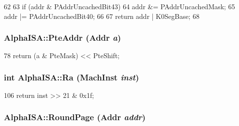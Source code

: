 \begin{DoxyCode}
62 {
63     if (addr & PAddrUncachedBit43) {
64         addr &= PAddrUncachedMask;
65         addr |= PAddrUncachedBit40;
66     }
67     return addr | K0SegBase;
68 }
\end{DoxyCode}
\hypertarget{namespaceAlphaISA_a7011d6b73edace006e7c43b09d9ae703}{
\subsubsection[{PteAddr}]{ AlphaISA::PteAddr ({\bf Addr} {\em a})}}
\label{namespaceAlphaISA_a7011d6b73edace006e7c43b09d9ae703}



\begin{DoxyCode}
78 { return (a & PteMask) << PteShift; }
\end{DoxyCode}
\hypertarget{namespaceAlphaISA_a5fb6bfaf48ec71f9e3354545d3aa85ff}{
\subsubsection[{Ra}]{\setlength{\rightskip}{0pt plus 5cm}int AlphaISA::Ra (MachInst {\em inst})}}
\label{namespaceAlphaISA_a5fb6bfaf48ec71f9e3354545d3aa85ff}



\begin{DoxyCode}
106 { return inst >> 21 & 0x1f; }
\end{DoxyCode}
\hypertarget{namespaceAlphaISA_a31ed8a5ee9eabb285172c3e8b40e0427}{
\subsubsection[{RoundPage}]{ AlphaISA::RoundPage ({\bf Addr} {\em addr})}}
\label{namespaceAlphaISA_a31ed8a5ee9eabb285172c3e8b40e0427}



